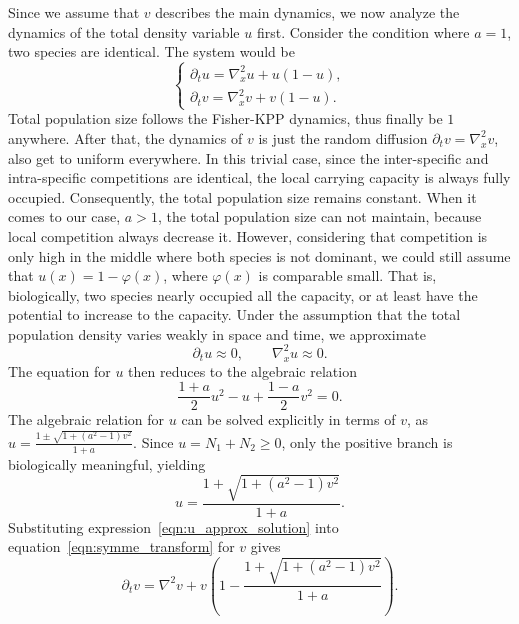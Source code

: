Since we assume that $v$ describes the main dynamics, we now analyze the dynamics of the total density variable $u$ first. Consider the condition where $a = 1$, two species are identical. The system would be 
\begin{equation*}
    \begin{cases}
        \partial_t u
        = \nabla_x^2 u
        + u(1-u),\\
        \partial_t v
        = \nabla_x^2 v + v(1-u).
    \end{cases}
\end{equation*}
Total population size follows the Fisher-KPP dynamics, thus finally be $1$ anywhere. After that, the dynamics of $v$ is just the random diffusion $\partial_t v = \nabla_x^2 v$, also get to uniform everywhere. In this trivial case, since the inter-specific and intra-specific competitions are identical, the local carrying capacity is always fully occupied. Consequently, the total population size remains constant. When it comes to our case, $a>1$, the total population size can not maintain, because local competition always decrease it. However, considering that competition is only high in the middle where both species is not dominant, we could still assume that $u(x) = 1 - \varphi(x)$, where $\varphi(x)$ is comparable small. That is, biologically, two species nearly occupied all the capacity, or at least have the potential to increase to the capacity. Under the assumption that the total population density varies weakly in space and time, we approximate
\begin{equation*}
    \partial_t u \approx 0,
    \qquad
    \nabla_x^2 u \approx 0.
\end{equation*}
The equation for $u$ then reduces to the algebraic relation
\begin{equation*}
    \frac{1+a}{2}u^2
    - u
    + \frac{1-a}{2}v^2
    = 0.
\end{equation*}
The algebraic relation for $u$ can be solved explicitly in terms of $v$, as $u = \frac{1 \pm \sqrt{1 + (a^2-1)v^2}}{1+a}$.
Since $u = N_1 + N_2 \geq 0$, only the positive branch is biologically meaningful, yielding
\begin{equation}\label{eqn:u_approx_solution}
    u = \frac{1 + \sqrt{1 + (a^2-1)v^2}}{1+a}.
\end{equation}
Substituting expression~\ref{eqn:u_approx_solution} into equation~\ref{eqn:symme_transform} for $v$ gives
\begin{equation}
    \partial_t v
    =
    \nabla^2 v
    +
    v
    \left(
        1
        -
        \frac{1+\sqrt{1+(a^2-1)v^2}}{1+a}
    \right).
\end{equation}

